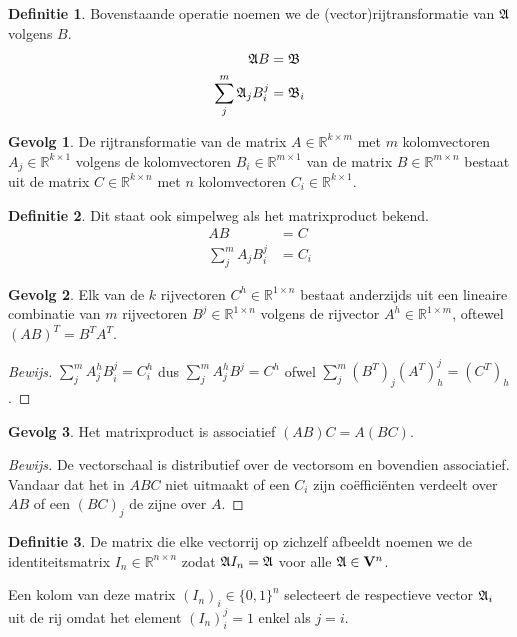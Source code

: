 \documentclass{amsart}
\theoremstyle{definition}
\newtheorem{dfn}{Definitie}[section]
\newtheorem{csq}{Gevolg}[section]
\newenvironment{bewijs}{\begin{proof}[Bewijs]}{\end{proof}}
\newcommand{\setsm}[1]{\{{#1}\}}
\newcommand{\realnums}{\mathbb{R}}
\newcommand{\realn}[1][n]{\realnums^{#1}}
\newcommand{\realmx}[2][n]{\realn[#2 \times #1]}
\newcommand{\realnxn}{\realmx{n}}
\newcommand{\realmxn}{\realmx{m}}
\newcommand{\vecspace}[1][v]{\mathrm{\mathbf{\MakeUppercase#1}}}
\newcommand{\vecspacen}[1][n]{\vecspace^#1}
\newcommand{\vecrow}[1][a]{\mathfrak{\MakeUppercase{#1}}}
\newcommand{\rvec}[2][i]{{#2}_{#1}}
\newcommand{\rvecr}[2][i]{\rvec[#1]{\vecrow[#2]}}
\newcommand{\rveci}[1][i]{\rvecr[#1]{a}}
\begin{document}
\begin{dfn}
    Bovenstaande operatie noemen we de (vector)rijtransformatie van $\vecrow$ volgens $B$.
    \begin{align*}
        \vecrow B &= \vecrow[b]\\
        \sum_{j}^{m} \rveci[j] B_i^j &= \rvecr{b}
    \end{align*}
\end{dfn}

\begin{csq}
    De rijtransformatie van de matrix $A \in \realmx[m]{k}$ met $m$ kolomvectoren $A_j \in \realn[k \times 1]$ volgens de kolomvectoren $B_i \in \realn[m \times 1]$ van de matrix $B \in \realmxn$ bestaat uit de matrix $C \in \realmx[n]{k}$ met $n$ kolomvectoren $C_i \in \realn[k \times 1]$.
\end{csq}

\begin{dfn}
    Dit staat ook simpelweg als het matrixproduct bekend.
    \begin{align*}
        AB &= C\\
        \sum_{j}^{m} A_j B_i^j &= C_i
    \end{align*}
\end{dfn}

\begin{csq}
    Elk van de $k$ rijvectoren $C^h \in \realn[1 \times n]$ bestaat anderzijds uit een lineaire combinatie van $m$ rijvectoren $B^j \in \realn[1 \times n]$ volgens de rijvector $A^h \in \realn[1 \times m]$, oftewel $(AB)^T = B^TA^T$.
    \begin{bewijs}
        $\sum_{j}^{m} A_j^h B_i^j = C_i^h$ dus $\sum_{j}^{m} A_j^h B^j = C^h$ ofwel $\sum_{j}^{m} (B^T)_j (A^T)_h^j = (C^T)_h$.
    \end{bewijs}
\end{csq}

\begin{csq}
    Het matrixproduct is associatief $(AB)C = A(BC)$.
    \begin{bewijs}
        De vectorschaal is distributief over de vectorsom en bovendien associatief.
        Vandaar dat het in $ABC$ niet uitmaakt of een $C_i$ zijn coëfficiënten verdeelt over $AB$ of een $(BC)_j$ de zijne over $A$.
    \end{bewijs}
\end{csq}

\begin{dfn}
    De matrix die elke vectorrij op zichzelf afbeeldt noemen we de identiteitsmatrix $I_n \in \realnxn$ zodat $\vecrow I_n = \vecrow$ voor alle $\vecrow \in \vecspacen$.

    Een kolom van deze matrix $(I_n)_i \in \setsm{0,1}^n$ selecteert de respectieve vector $\rveci$ uit de rij omdat het element $(I_n)_i^j = 1$ enkel als $j=i$.
\end{dfn}
\end{document}
